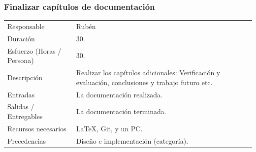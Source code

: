 \subsubsection{Finalizar cap\'{i}tulos de documentaci\'{o}n}
\begin{table}[H]
    \begin{center}
        \begin{tabular}{l p{8cm}}
            Responsable                           & Rub\'{e}n \\
            Duraci\'{o}n                          & 30. \\ 
            Esfuerzo (Horas / Persona)            & 30. \\
            Descripci\'{o}n                       & Realizar los cap\'{i}tulos adicionales: Verificaci\'{o}n y evaluaci\'{o}n, conclusiones y trabajo futuro
                                                    etc. \\
            Entradas                              & La documentaci\'{o}n realizada. \\
            Salidas / Entregables                 & La documentaci\'{o}n terminada. \\
            Recursos necesarios                   & \LaTeX, Git, y un PC. \\
            Precedencias                          & Dise\~{n}o e implementaci\'{o}n (categor\'{i}a). \\
        \end{tabular}
    \end{center}
    
\end{table}

